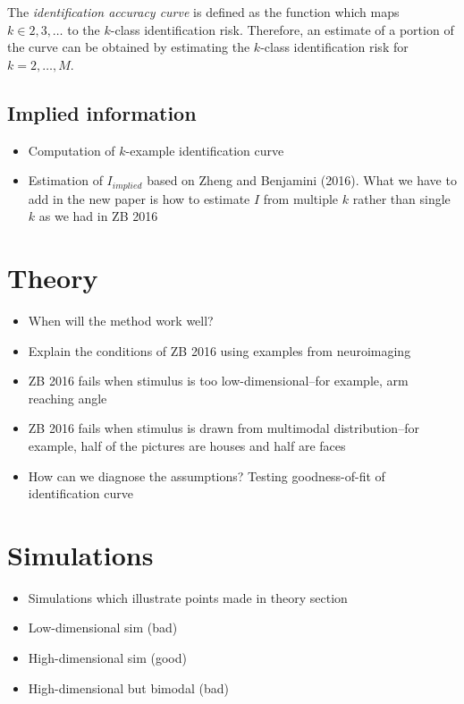 \documentclass[12pt]{article}
\begin{document}
The \emph{identification accuracy curve} is defined as the function which maps $k \in 2,3,\hdots$ to the $k$-class identification risk.  Therefore, an estimate of a portion of the curve can be obtained by estimating the $k$-class identification risk for $k = 2,\hdots, M$.

\subsection{Implied information}







\begin{itemize}
\item Computation of $k$-example identification curve
\item Estimation of $I_{implied}$ based on Zheng and Benjamini (2016). What we have to add in the new paper is how to estimate $I$ from multiple $k$ rather than single $k$ as we had in ZB 2016
\end{itemize}

\section{Theory}

\begin{itemize}
\item When will the method work well?
\item Explain the conditions of ZB 2016 using examples from neuroimaging
\item ZB 2016 fails when stimulus is too low-dimensional--for example, arm reaching angle
\item ZB 2016 fails when stimulus is drawn from multimodal distribution--for example, half of the pictures are houses and half are faces
\item How can we diagnose the assumptions? Testing goodness-of-fit of identification curve
\end{itemize}

\section{Simulations}

\begin{itemize}
\item Simulations which illustrate points made in theory section
\item Low-dimensional sim (bad)
\item High-dimensional sim (good)
\item High-dimensional but bimodal (bad)
\end{itemize}
\end{document}
